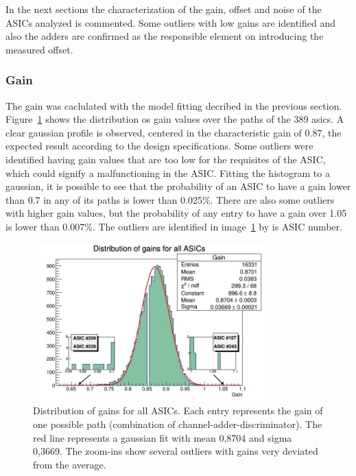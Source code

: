 \documentclass[a4paper,10pt]{book}
\begin{document}
In the next sections the characterization of the gain, offset and noise of the ASICs analyzed is commented. Some outliers with low gains are identified and also the adders are confirmed as the responsible element 
on introducing the measured offset.

\subsubsection{Gain}

The gain was caclulated with the model fitting decribed in the previous section. Figure~\ref{fig:gaindist} shows the distribution os gain values over the paths of the 389 asics. A clear gaussian profile is observed, 
centered in the characteristic gain of 0.87, the expected result according to the design specifications. Some outliers were identified having gain values that are too low for the requisites of the ASIC, 
which could signify a malfunctioning in the ASIC. Fitting the histogram to a gaussian, it is possible to see that the probability of an ASIC to have a gain lower than 0.7 in any of its paths is lower than 0.025\%.
There are also some outliers with higher gain values, but the probability of any entry to have a gain over 1.05 is lower than 0.007\%. The outliers are identified in image~\ref{fig:gaindist} by is ASIC number.
\\
\begin{figure}
\centering
 \includegraphics[width=0.8\textwidth]{./gaindistribution.jpg}
  \caption{Distribution of gains for all ASICs. Each entry represents the gain of one possible path (combination of channel-adder-discriminator). The red line represents a gaussian fit with mean 0,8704 and sigma 0,3669. 
  The zoom-ins show several outliers with gains very deviated from the average. }
    \label{fig:gaindist}
\end{figure}
\end{document}
